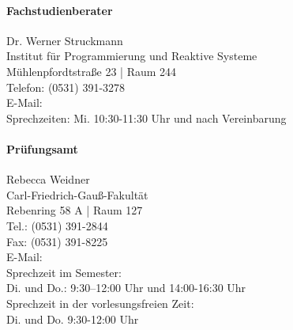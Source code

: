 	\paragraph{Fachstudienberater}
		Dr. Werner Struckmann\\
		Institut für Programmierung und Reaktive Systeme\\
		Mühlenpfordtstraße 23 | Raum 244\\
		Telefon: (0531) 391-3278\\
		E-Mail: \\
		Sprechzeiten: Mi. 10:30-11:30 Uhr und nach  Vereinbarung

	\paragraph{Prüfungsamt}
		Rebecca Weidner\\
		Carl-Friedrich-Gauß-Fakultät\\
		Rebenring 58 A | Raum 127\\
		Tel.: (0531) 391-2844\\
		Fax: (0531) 391-8225\\
		E-Mail: \\
		Sprechzeit im Semester:\\
		Di. und Do.: 9:30–12:00 Uhr und 14:00-16:30 Uhr\\
		Sprechzeit in der vorlesungsfreien Zeit:\\
		Di. und Do. 9:30-12:00 Uhr
